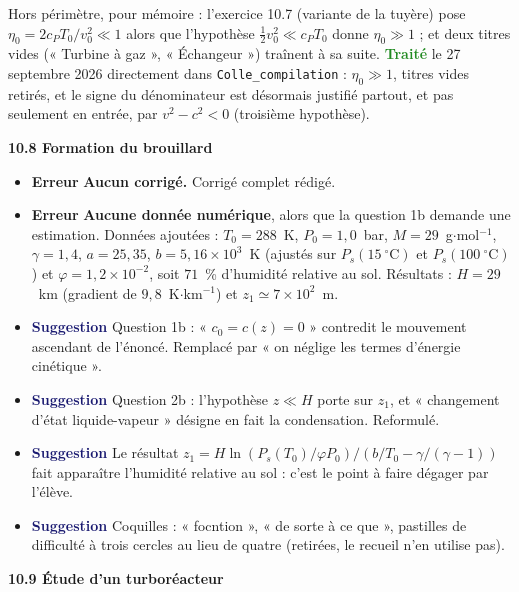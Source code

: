 \documentclass[a4paper,11pt]{article}
\newcommand{\exo}[1]{\vspace{0.7\baselineskip}\noindent\textbf{\large #1}\par\nopagebreak\vspace{0.2\baselineskip}}
\newcommand{\erreur}{\textcolor{BrickRed}{\textbf{Erreur}}}
\newcommand{\suggestion}{\textcolor{MidnightBlue}{\textbf{Suggestion}}}
\newcommand{\traite}{\textcolor{ForestGreen}{\textbf{Traité}}}
\begin{document}
\noindent Hors périmètre, pour mémoire : l'exercice 10.7 (variante de la tuyère) pose
$\eta_0=2c_PT_0/v_0^2\ll1$ alors que l'hypothèse $\frac{1}{2}v_0^2\ll c_PT_0$ donne
$\eta_0\gg1$ ; et deux titres vides (« Turbine à gaz », « Échangeur ») traînent à sa suite.
\traite{} le 27 septembre 2026 directement dans \texttt{Colle\_compilation} : $\eta_0\gg1$, titres
vides retirés, et le signe du dénominateur est désormais justifié partout, et pas seulement en entrée,
par $v^2-c^2<0$ (troisième hypothèse).

\exo{10.8 Formation du brouillard}

\begin{itemize}
	\item \erreur{} \textbf{Aucun corrigé.} Corrigé complet rédigé.
	\item \erreur{} \textbf{Aucune donnée numérique}, alors que la question 1b demande une estimation.
	Données ajoutées : $T_0=288$~K, $P_0=1{,}0$~bar, $M=29$~g$\cdot$mol$^{-1}$, $\gamma=1{,}4$,
	$a=25{,}35$, $b=5{,}16\times10^{3}$~K (ajustés sur $P_s(15~^\circ\text{C})$ et
	$P_s(100~^\circ\text{C})$) et $\varphi=1{,}2\times10^{-2}$, soit $71$~\% d'humidité relative au sol.
	Résultats : $H=29$~km (gradient de $9{,}8$~K$\cdot$km$^{-1}$) et $z_1\simeq7\times10^{2}$~m.
	\item \suggestion{} Question 1b : « $c_0=c(z)=0$ » contredit le mouvement ascendant de
	l'énoncé. Remplacé par « on néglige les termes d'énergie cinétique ».
	\item \suggestion{} Question 2b : l'hypothèse $z\ll H$ porte sur $z_1$, et « changement d'état
	liquide-vapeur » désigne en fait la condensation. Reformulé.
	\item \suggestion{} Le résultat $z_1=H\ln\left(P_s(T_0)/\varphi P_0\right)/(b/T_0-\gamma/(\gamma-1))$
	fait apparaître l'humidité relative au sol : c'est le point à faire dégager par l'élève.
	\item \suggestion{} Coquilles : « focntion », « de sorte à ce que », pastilles de difficulté à trois
	cercles au lieu de quatre (retirées, le recueil n'en utilise pas).
\end{itemize}

\exo{10.9 Étude d'un turboréacteur}
\end{document}

